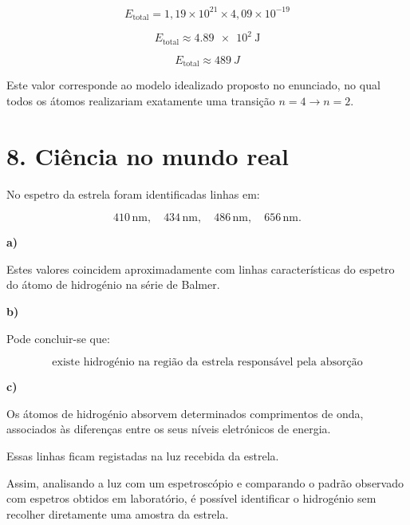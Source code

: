 \documentclass[11pt,a4paper]{article}
\newcounter{exercicio}
\newenvironment{resolucao}[1]
{
	\refstepcounter{exercicio}
	\begin{tcolorbox}[
		enhanced,
		breakable,
		colback=white,
		colframe=eublue,
		boxrule=0.8pt,
		arc=2mm,
		left=3mm,
		right=3mm,
		top=2mm,
		bottom=2mm,
		title={
			\textbf{Exercício \theexercicio}
			\hspace{1mm}--\hspace{1mm}#1
		},
		coltitle=white,
		colbacktitle=eublue,
		fonttitle=\bfseries
		]
	}
	{
	\end{tcolorbox}
}
\begin{document}
\begin{tcolorbox}[
		enhanced,
		breakable,
		colback=eulightorange,
		colframe=euorange,
		title=\textbf{Resolução},
		fonttitle=\bfseries
		]
		\[
		E_{\text{total}}
		=
		1,19\times10^{21}
		\times
		4,09\times10^{-19}
		\]
		
		\[
		E_{\text{total}}
		\approx
		\SI{4,89e2}{\joule}
		\]
		
		\[
		\boxed{
			E_{\text{total}}
			\approx
			\SI{489}{J}
		}
		\]
		
		Este valor corresponde ao modelo idealizado proposto no enunciado,
		no qual todos os átomos realizariam exatamente uma transição
		\(n=4\rightarrow n=2\).
		
	\end{tcolorbox}
	
	
	\section*{\textcolor{eugreen}{8. Ciência no mundo real}}
	
	\begin{resolucao}{Interpretar o espetro de uma estrela}
		
		No espetro da estrela foram identificadas linhas em:
		
		\[
		410\,\mathrm{nm},
		\quad
		434\,\mathrm{nm},
		\quad
		486\,\mathrm{nm},
		\quad
		656\,\mathrm{nm}.
		\]
		
		\textbf{a)}
		
		Estes valores coincidem aproximadamente com linhas características do
		espetro do átomo de hidrogénio na série de Balmer.
		
		\textbf{b)}
		
		Pode concluir-se que:
		
		\[
		\boxed{
			\text{existe hidrogénio na região da estrela responsável pela absorção}
		}
		\]
		
		\textbf{c)}
		
		Os átomos de hidrogénio absorvem determinados comprimentos de onda,
		associados às diferenças entre os seus níveis eletrónicos de energia.
		
		Essas linhas ficam registadas na luz recebida da estrela.
		
		Assim, analisando a luz com um espetroscópio e comparando o padrão
		observado com espetros obtidos em laboratório, é possível identificar
		o hidrogénio sem recolher diretamente uma amostra da estrela.
		
	\end{resolucao}
	
\end{document}
